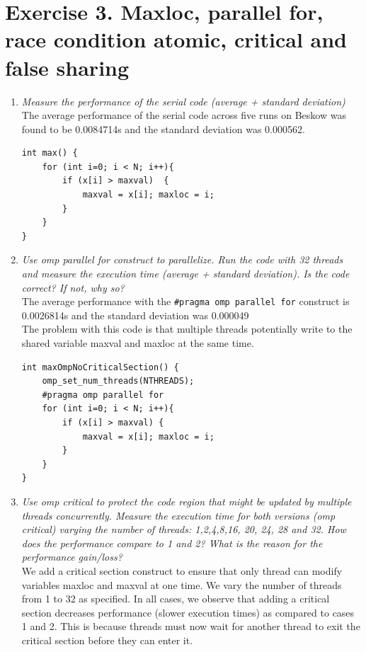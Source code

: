 \documentclass[12pt]{article}
\begin{document}
\section{Exercise 3. Maxloc, parallel for, race condition atomic, critical and false sharing}
\begin{enumerate}
    \item \textit{Measure the performance of the serial code (average + standard deviation)}\\
    The average performance of the serial code across five runs on Beskow was found to be 0.0084714s and the standard deviation was 0.000562.\\
    
    \begin{lstlisting}[style=CStyle]
int max() {
	for (int i=0; i < N; i++){
		if (x[i] > maxval)  {
			maxval = x[i]; maxloc = i;
		}
	}
}

\end{lstlisting}
    \item \textit{Use omp parallel for construct to parallelize. Run the code with 32 threads and measure the execution time (average + standard deviation). Is the code correct? If not, why so?}\\
    The average performance with the \texttt{\#pragma omp parallel for} construct is 0.0026814s and the standard deviation was 0.000049\\
    The problem with this code is that multiple threads potentially write to the shared variable maxval and maxloc at the same time.\\
    
    \begin{lstlisting}[style=CStyle]
int maxOmpNoCriticalSection() {
	omp_set_num_threads(NTHREADS);
	#pragma omp parallel for
	for (int i=0; i < N; i++){
		if (x[i] > maxval) {
			maxval = x[i]; maxloc = i;
		}
	}
}
    \end{lstlisting}
    \item \textit{Use omp critical  to protect the code region that might be updated by multiple threads concurrently. Measure the execution time for both versions (omp critical) varying the number of threads: 1,2,4,8,16, 20, 24, 28 and 32. How does the performance compare to 1 and 2? What is the reason for the performance gain/loss?}\\
    We add a critical section construct to ensure that only thread can modify variables maxloc and maxval at one time. We vary the number of threads from 1 to 32 as specified. In all cases, we observe that adding a critical section decreases performance (slower execution times) as compared to cases 1 and 2. This is because threads must now wait for another thread to exit the critical section before they can enter it.\\
    

\end{enumerate}
\end{document}
